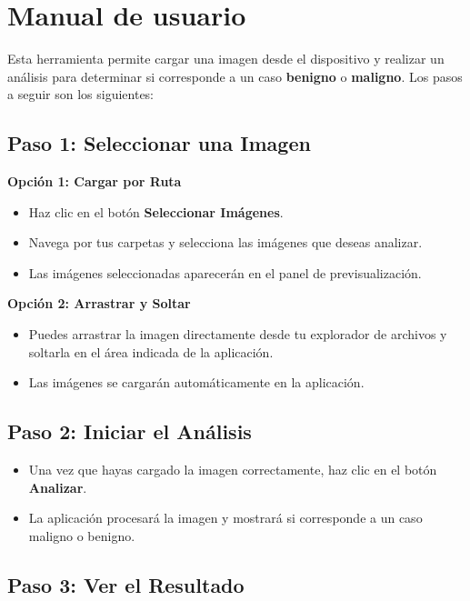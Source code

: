 \documentclass[12pt]{article} %
\begin{document}
\section{Manual de usuario}

Esta herramienta permite cargar una imagen desde el dispositivo y realizar un análisis para determinar si corresponde a un caso \textbf{benigno} o \textbf{maligno}. Los pasos a seguir son los siguientes:

\subsection*{Paso 1: Seleccionar una Imagen}

\textbf{Opción 1: Cargar por Ruta}
\begin{itemize}
    \item Haz clic en el botón \textbf{Seleccionar Imágenes}.
    \item Navega por tus carpetas y selecciona las imágenes que deseas analizar.
    \item Las imágenes seleccionadas aparecerán en el panel de previsualización.
\end{itemize}

\textbf{Opción 2: Arrastrar y Soltar}
\begin{itemize}
    \item Puedes arrastrar la imagen directamente desde tu explorador de archivos y soltarla en el área indicada de la aplicación.
    \item Las imágenes se cargarán automáticamente en la aplicación.
\end{itemize}

\subsection*{Paso 2: Iniciar el Análisis}

\begin{itemize}
    \item Una vez que hayas cargado la imagen correctamente, haz clic en el botón \textbf{Analizar}.
    \item La aplicación procesará la imagen y mostrará si corresponde a un caso maligno o benigno.
\end{itemize}

\subsection*{Paso 3: Ver el Resultado}
\end{document}
